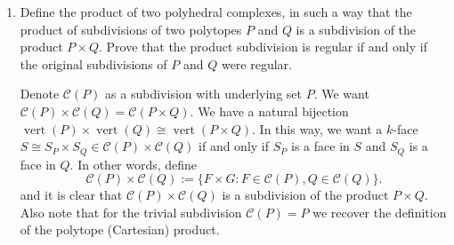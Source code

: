 \documentclass{article}
\begin{document}
\begin{enumerate}
\begin{solution}
\begin{enumerate}[label=(\roman*)]
\begin{figure}[h]
{
 }
 \caption{Non-regular triangulation of $C_4$, and the (sub)triangulation of $C_3$}
 \end{figure}

In this $C_4$ we have the vertices $0000, 1000, 1001, 1010, 1100$ as the vertices for the $4$-simplex. Then, the remaining $4$ facets ($C_3$) are triangulated as per the $C_3$ (sub)triangulation, oriented to agree with the dotted edges.

\item Ok.

\item Just read [182]

\item I uhm, I don't know really
\end{enumerate}
\end{solution}

\item Define the product of two polyhedral complexes, in such a way that the product of subdivisions of two polytopes $P$ and $Q$ is a subdivision of the product $P\times Q$. Prove that the product subdivision is regular if and only if the original subdivisions of $P$ and $Q$ were regular.

\begin{solution}
    Denote $\mathcal{C}(P)$ as a subdivision with underlying set $P$. We want $\mathcal{C}(P) \times \mathcal{C}(Q) = \mathcal{C}(P\times Q)$. We have a natural bijection $\operatorname{vert}(P) \times \operatorname{vert}(Q) \cong \operatorname{vert}(P\times Q)$. In this way, we want a $k$-face $S \cong S_P \times S_Q \in \mathcal{C}(P) \times \mathcal{C}(Q)$ if and only if $S_P$ is a face in $S$ and $S_Q$ is a face in $Q$. In other words, define
    \[\mathcal{C}(P) \times \mathcal{C}(Q) := \{F \times G: F \in \mathcal{C}(P), Q\in \mathcal{C}(Q)\}.\]
    and it is clear that $\mathcal{C}(P) \times \mathcal{C}(Q)$ is a subdivision of the product $P\times Q$. Also note that for the trivial subdivision $\mathcal{C}(P) = P$ we recover the definition of the polytope (Cartesian) product.


\end{solution}
\end{enumerate}
\end{document}
